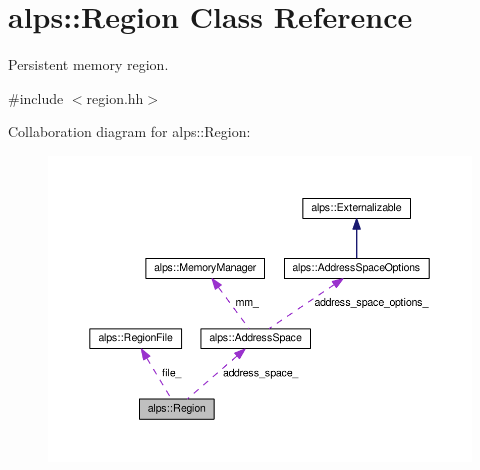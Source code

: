 \hypertarget{classalps_1_1Region}{}\section{alps\+:\+:Region Class Reference}
\label{classalps_1_1Region}


Persistent memory region.  




{\ttfamily \#include $<$region.\+hh$>$}



Collaboration diagram for alps\+:\+:Region\+:
\nopagebreak
\begin{figure}[H]
\begin{center}
\leavevmode
\includegraphics[width=350pt]{classalps_1_1Region__coll__graph}
\end{center}
\end{figure}
